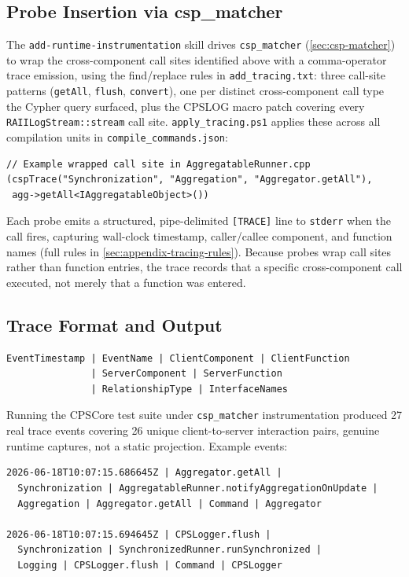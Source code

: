 \subsection{Probe Insertion via csp\_matcher}\label{sec:trace-probe-insertion}

The \texttt{add-runtime-instrumentation} skill drives \texttt{csp\_matcher}
(\cref{sec:csp-matcher}) to wrap the cross-component call sites
identified above with a comma-operator trace emission, using the
find/replace rules in \texttt{add\_tracing.txt}: three call-site
patterns (\texttt{getAll}, \texttt{flush}, \texttt{convert}), one per
distinct cross-component call type the Cypher query surfaced, plus the
CPSLOG macro patch covering every \texttt{RAIILogStream::stream} call
site. \texttt{apply\_tracing.ps1} applies these across all compilation
units in \texttt{compile\_commands.json}:

\begin{verbatim}
// Example wrapped call site in AggregatableRunner.cpp
(cspTrace("Synchronization", "Aggregation", "Aggregator.getAll"),
 agg->getAll<IAggregatableObject>())
\end{verbatim}

Each probe emits a structured, pipe-delimited \texttt{[TRACE]} line to
\texttt{stderr} when the call fires, capturing wall-clock timestamp,
caller/callee component, and function names (full rules in
\cref{sec:appendix-tracing-rules}). Because probes wrap call sites
rather than function entries, the trace records that a specific
cross-component call executed, not merely that a function was entered.

\subsection{Trace Format and Output}

\begin{verbatim}
EventTimestamp | EventName | ClientComponent | ClientFunction
               | ServerComponent | ServerFunction
               | RelationshipType | InterfaceNames
\end{verbatim}

Running the CPSCore test suite under \texttt{csp\_matcher} instrumentation
produced 27 real trace events covering 26 unique client-to-server
interaction pairs, genuine runtime captures, not a static projection.
Example events:

\begin{verbatim}
2026-06-18T10:07:15.686645Z | Aggregator.getAll |
  Synchronization | AggregatableRunner.notifyAggregationOnUpdate |
  Aggregation | Aggregator.getAll | Command | Aggregator

2026-06-18T10:07:15.694645Z | CPSLogger.flush |
  Synchronization | SynchronizedRunner.runSynchronized |
  Logging | CPSLogger.flush | Command | CPSLogger
\end{verbatim}

